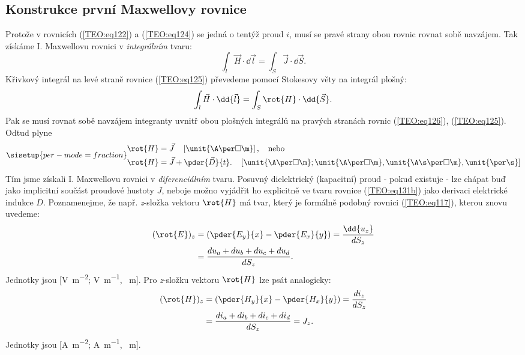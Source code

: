     \subsection{Konstrukce první Maxwellovy rovnice}
      Protože v rovnicích (\ref{TEO:eq122}) a (\ref{TEO:eq124}) se jedná o tentýž 
      proud \(i\), musí se pravé strany obou rovnic rovnat sobě navzájem. Tak získáme I. 
      Maxwellovu rovnici v \emph{integrálním} tvaru:
      \begin{equation}\label{TEO:eq125}
        \int_l \vec{H}\cdot \dd{\vec{l}} = \int_S \vec{J}\cdot \dd{\vec{S}}.
      \end{equation} 
      Křivkový integrál na levé straně rovnice (\ref{TEO:eq125}) převedeme pomocí Stokesovy 
      věty na integrál plošný:	
      \begin{equation}\label{TEO:eq126}
        \int_l \vec{H}\cdot \dd{\vec{l}} = \int_S \rot{H}\cdot \dd{\vec{S}}.
      \end{equation} 
      Pak se musí rovnat sobě navzájem integranty uvnitř obou plošných integrálů na pravých 
      stranách rovnic (\ref{TEO:eq126}), (\ref{TEO:eq125}). Odtud plyne
      \begin{subequations}
        \sisetup{per-mode=fraction}
        \begin{align}
          \rot{H} &= \vec{J}   \quad 
            \left[\unit{\A\per\square\m}\right], \quad\text{nebo}              \label{TEO:eq131a} \\
          \rot{H} &= \vec{J} + \pder{\vec{D}}{t}. \quad
          \left[\unit{\A\per\square\m}; \unit{\A\per\square\m},
            \unit{\A\s\per\square\m}, \unit{\per\s}\right]                       \label{TEO:eq131b}
        \end{align}
      \end{subequations}
      Tím jsme získali I. Maxwellovu rovnici v \emph{diferenciálním} tvaru. Posuvný dielektrický
      (kapacitní) proud - pokud existuje - lze chápat buď jako implicitní součást proudové hustoty
      \(J\), neboje možno vyjádřit ho explicitně ve tvaru rovnice (\ref{TEO:eq131b}) jako derivaci
      elektrické indukce \(D\). Poznamenejme, že např. \emph{z}-složka vektoru \(\rot{H}\) má tvar,
      který je formálně podobný rovnici (\ref{TEO:eq117}), kterou znovu uvedeme:
      \begin{align*}
         (\rot{E})_z &= \left(\pder{E_y}{x} - \pder{E_x}{y}\right)
                      = \frac{\dd{u_z}}{dS_z}                                                  \\
                     &= \frac{du_a + du_b + du_c + du_d}{dS_z}.
      \end{align*}
      Jednotky jsou [\unit{\V\per\m^2}; \unit{\V\per\m}, \unit{\per\m}]. Pro \emph{z}-složku vektoru
      \(\rot{H}\) lze psát analogicky:
      \begin{align*}
        (\rot{H})_z &= \left(\pder{H_y}{x} - \pder{H_x}{y}\right)
                     = \frac{di_z}{dS_z}                                                   \\
                    &= \frac{di_a + di_b + di_c + di_d}{dS_z} = J_z.
      \end{align*}
      Jednotky jsou [\unit{\A\per\m^2}; \unit{\A\per\m}, \unit{\per\m}].

